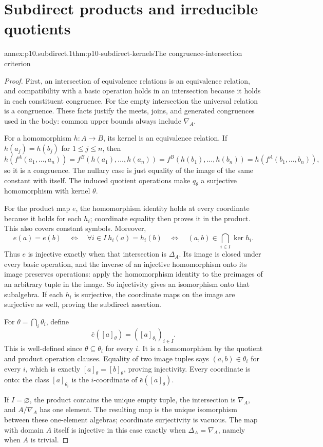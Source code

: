 
\section{Subdirect products and irreducible quotients}

\begin{annexitem}{annex:p10.subdirect.1}{thm:p10-subdirect-kernels}{The congruence-intersection criterion}
\begin{proof}
First, an intersection of equivalence relations is an equivalence
relation, and compatibility with a basic operation holds in an
intersection because it holds in each constituent congruence.
For the empty intersection the universal relation is a congruence.
These facts justify the meets, joins, and generated congruences used
in the body: common upper bounds always include \(\nabla_A\).

For a homomorphism \(h:A\to B\), its kernel is an equivalence relation.  If
\(h(a_j)=h(b_j)\) for \(1\leq j\leq n\), then
\[
 h(f^A(a_1,\ldots,a_n))
  =f^B(h(a_1),\ldots,h(a_n))
  =f^B(h(b_1),\ldots,h(b_n))
  =h(f^A(b_1,\ldots,b_n)),
\]
so it is a congruence.  The nullary case is just equality of the
image of the same constant with itself.
The induced quotient operations make \(q_\theta\) a surjective
homomorphism with kernel \(\theta\).

For the product map \(e\), the homomorphism identity holds at every
coordinate because it holds for each \(h_i\); coordinate equality
then proves it in the product.  This also covers constant symbols.
Moreover,
\[
 e(a)=e(b)
 \quad\Longleftrightarrow\quad
 \forall i\in I\ h_i(a)=h_i(b)
 \quad\Longleftrightarrow\quad
 (a,b)\in\bigcap_{i\in I}\ker h_i.
\]
Thus \(e\) is injective exactly when that intersection is
\(\Delta_A\).  Its image is closed under every basic operation,
and the inverse of an injective homomorphism onto its image
preserves operations: apply the homomorphism identity to the
preimages of an arbitrary tuple in the image.
So injectivity gives an isomorphism onto that subalgebra.
If each \(h_i\) is surjective, the coordinate maps on the image
are surjective as well, proving the subdirect assertion.

For \(\theta=\bigcap_i\theta_i\), define
\[
 \bar e([a]_\theta)=([a]_{\theta_i})_{i\in I}.
\]
This is well-defined since \(\theta\subseteq\theta_i\) for every
\(i\).  It is a homomorphism by the quotient and product operation
clauses.  Equality of two image tuples says
\((a,b)\in\theta_i\) for every \(i\), which is exactly
\([a]_\theta=[b]_\theta\), proving injectivity.
Every coordinate is onto: the class \([a]_{\theta_i}\) is the
\(i\)-coordinate of \(\bar e([a]_\theta)\).

If \(I=\varnothing\), the product contains the unique empty tuple,
the intersection is \(\nabla_A\), and \(A/\nabla_A\) has one
element.  The resulting map is the unique isomorphism between
these one-element algebras; coordinate surjectivity is vacuous.
The map with domain \(A\) itself is injective in this case exactly
when \(\Delta_A=\nabla_A\), namely when \(A\) is trivial.
\end{proof}
\end{annexitem}

